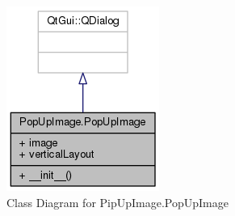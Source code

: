 \begin{figure}
\centering
\includegraphics[scale=.85]{images/popupimage.png}
\caption{Class Diagram for PipUpImage.PopUpImage}
\label{fig:classAnnotation__coll__graphh}
\end{figure}
